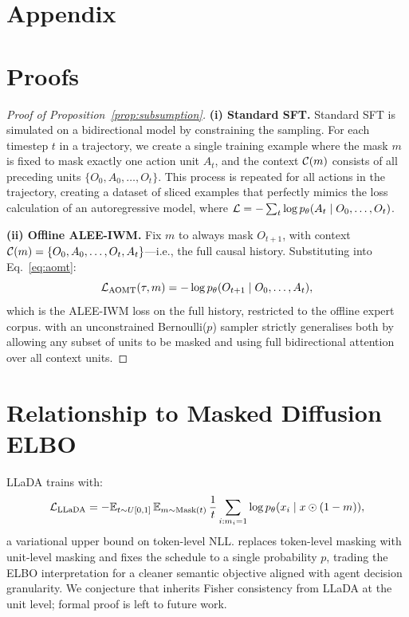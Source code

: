 \section*{Appendix}
\setcounter{section}{0}
\renewcommand{\thesection}{\Alph{section}}

\section{Proofs}
\label{app:proofs}

\begin{proof}[Proof of Proposition~\ref{prop:subsumption}]
\textbf{(i) Standard SFT.}
Standard SFT is simulated on a bidirectional model by constraining the sampling. For each timestep $t$ in a trajectory, we create a single training example where the mask $m$ is fixed to mask exactly one action unit $A_t$, and the context $\mathcal{C}(m)$ consists of all preceding units $\{O_0, A_0, \ldots, O_t\}$. This process is repeated for all actions in the trajectory, creating a dataset of sliced examples that perfectly mimics the loss calculation of an autoregressive model, where $\mathcal{L} = -\sum_t \log p_\theta(A_t \mid O_0, \ldots, O_t)$.

\textbf{(ii) Offline ALEE-IWM.}
Fix $m$ to always mask $O_{t+1}$, with context $\mathcal{C}(m) = \{O_0, A_0, \ldots, O_t, A_t\}$---i.e., the full causal history.
Substituting into Eq.~\eqref{eq:aomt}:
\[
  \mathcal{L}_{\text{AOMT}}(\tau,m) = -\log p_\theta(O_{t+1} \mid O_0, \ldots, A_t),
\]
which is the ALEE-IWM loss on the full history, restricted to the offline expert corpus.
\aomt{} with an unconstrained Bernoulli($p$) sampler strictly generalises both
by allowing any subset of units to be masked and using full bidirectional
attention over all context units.
\end{proof}

\section{Relationship to Masked Diffusion ELBO}
\label{app:elbo}

LLaDA \citep{nie2025llada} trains with:
\begin{equation}
  \mathcal{L}_{\text{LLaDA}} = -\mathbb{E}_{t \sim U[0,1]}\,
    \mathbb{E}_{m \sim \mathrm{Mask}(t)}\,
    \frac{1}{t} \sum_{i : m_i=1} \log p_\theta(x_i \mid x \odot (1-m)),
\end{equation}
a variational upper bound on token-level NLL.
\aomt{} replaces token-level masking with unit-level masking and fixes the
schedule to a single probability $p$, trading the ELBO interpretation for a
cleaner semantic objective aligned with agent decision granularity.
We conjecture that \aomt{} inherits Fisher consistency from LLaDA at the unit
level; formal proof is left to future work.

